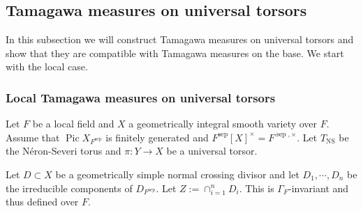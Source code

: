 \documentclass[a4paper,11pt,reqno]{amsart}
\DeclareMathOperator{\Pic}{Pic}
\DeclareMathOperator{\NS}{NS}
\DeclareMathOperator{\sep}{sep}
\theoremstyle{definition}
\begin{document}
\subsection{Tamagawa measures on universal torsors}
In this subsection we will construct Tamagawa measures on universal torsors and show that they are compatible with Tamagawa measures on the base. We start with the local case.
\subsubsection{Local Tamagawa measures on universal torsors}\label{section:Tamagawa measures local}
Let $F$ be a local field and $X$ a geometrically integral smooth variety over $F$. Assume that $\Pic X_{F^{\sep}}$ is finitely generated and $F^{\sep}[X]^{\times} = F^{\sep, \times}$. Let $T_{\NS}$ be the N\'eron-Severi torus and $\pi: Y \to X$ be a universal torsor.

Let $D \subset X$ be a geometrically simple normal crossing divisor and let $D_1, \cdots, D_n$ be the irreducible components of $D_{F^{\sep}}$. Let $Z := \cap_{i = 1}^n D_i$. This is $\Gamma_F$-invariant and thus defined over $F$.
\end{document}
